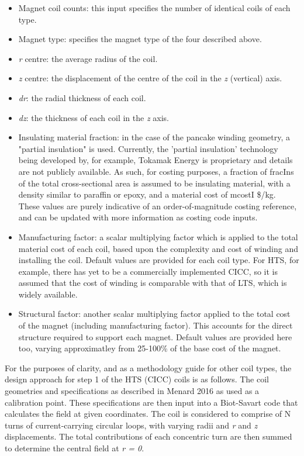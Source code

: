 \begin{itemize}
    \item Magnet coil counts: this input specifies the number of identical coils of each type.
    \item Magnet type: specifies the magnet type of the four described above.
    \item \textit{r} centre: the average radius of the coil.
    \item \textit{z} centre: the displacement of the centre of the coil in the \textit{z} (vertical) axis.
    \item \textit{dr}: the radial thickness of each coil.
    \item \textit{dz}: the thickness of each coil in the \textit{z} axis.
    \item Insulating material fraction: in the case of the pancake winding geometry, a "partial insulation" is used. Currently, the 'partial insulation' technology being developed by, for example, Tokamak Energy is proprietary and details are not publicly available. As such, for costing purposes, a fraction of fracIns of the total cross-sectional area is assumed to be insulating material, with a density similar to paraffin or epoxy, and a material cost of mcostI \$/kg. These values are purely indicative of an order-of-magnitude costing reference, and can be updated with more information as costing code inputs.
    \item Manufacturing factor: a scalar multiplying factor which is applied to the total material cost of each coil, based upon the complexity and cost of winding and installing the coil. Default values are provided for each coil type. For HTS, for example, there has yet to be a commercially implemented CICC, so it is assumed that the cost of winding is comparable with that of LTS, which is widely available. 
    \item Structural factor: another scalar multiplying factor applied to the total cost of the magnet (including manufacturing factor). This accounts for the direct structure required to support each magnet. Default values are provided here too, varying approximatley from 25-100\% of the base cost of the magnet.
\end{itemize}

For the purposes of clarity, and as a methodology guide for other coil types, the design approach for step 1 of the HTS (CICC) coils is as follows. The coil geometries and specifications as described in Menard 2016 \cite{Menard2016} as used as a calibration point. These specifications are then input into a Biot-Savart code that calculates the field at given coordinates. The coil is considered to comprise of N turns of current-carrying circular loops, with varying radii and \textit{r} and \textit{z} displacements. The total contributions of each concentric turn are then summed to determine the central field at \textit{r = 0}.

